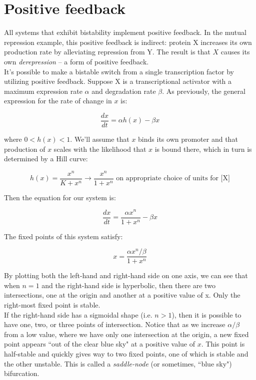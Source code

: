 \documentclass{article}
\begin{document}
\large

\section*{Positive feedback}

All systems that exhibit bistability implement positive feedback. In the mutual repression example, this positive feedback is indirect: protein X increases its own production rate by alleviating repression from Y. The result is that $X$ causes its own \textit{derepression} -- a form of positive feedback.\\

It's possible to make a bistable switch from a single transcription factor by utilizing positive feedback. Suppose X is a transcriptional activator with a maximum expression rate $\alpha$ and degradation rate $\beta$. As previously, the general expression for the rate of change in $x$ is:

\[ \frac{dx}{dt} = \alpha h(x) - \beta x \]

where $0<h(x)<1$. We'll assume that $x$ binds its own promoter and that production of $x$ scales with the likelihood that $x$ is bound there, which in turn is determined by a Hill curve:

\[ h(x) = \frac{x^n}{K + x^n} \rightarrow  \frac{x^n}{1 + x^n} \textrm{  on appropriate choice of units for [X]} \]

Then the equation for our system is:

\[ \frac{dx}{dt} = \frac{\alpha x^n}{1 + x^n} - \beta x \]

The fixed points of this system satisfy:

\[ x = \frac{\alpha x^{n}/\beta }{1 + x^{n}} \]

By plotting both the left-hand and right-hand side on one axis, we can see that when $n=1$ and the right-hand side is hyperbolic, then there are two intersections, one at the origin and another at a positive value of x. Only the right-most fixed point is stable.\\

If the right-hand side has a sigmoidal shape (i.e. $n>1$), then it is possible to have one, two, or three points of intersection. Notice that as we increase $\alpha/\beta$ from a low value, where we have only one intersection at the origin, a new fixed point appears ``out of the clear blue sky" at a positive value of $x$. This point is half-stable and quickly gives way to two fixed points, one of which is stable and the other unstable. This is called a \textit{saddle-node} (or sometimes, ``blue sky") bifurcation.
\end{document}
